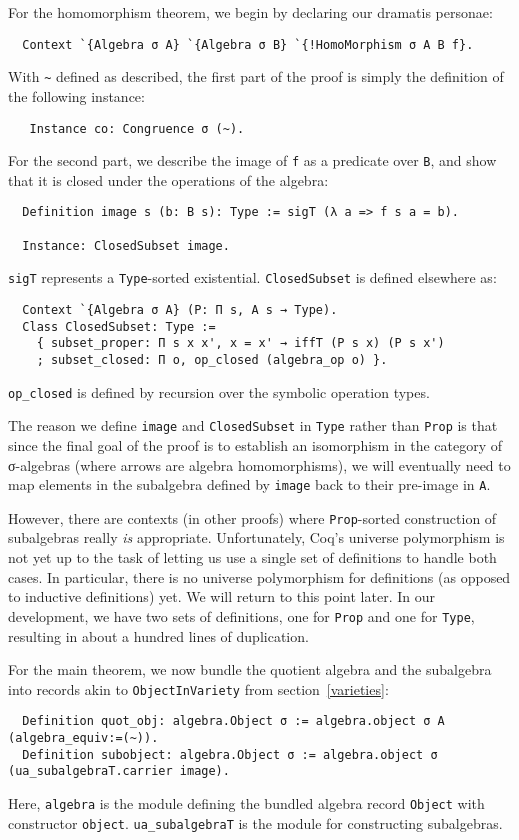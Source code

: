 \documentclass[a4paper,10pt,runningheads]{llncs}
\begin{document}
For the homomorphism theorem, we begin by declaring our dramatis personae:
\begin{lstlisting}
  Context `{Algebra σ A} `{Algebra σ B} `{!HomoMorphism σ A B f}.
\end{lstlisting}
With \lstinline|~| defined as described, the first part of the proof is simply the definition of the following instance:
\begin{lstlisting}
   Instance co: Congruence σ (~).
\end{lstlisting}

For the second part, we describe the image of \lstinline|f| as a predicate over \lstinline|B|, and show that it is closed under the operations of the algebra: 
\begin{lstlisting}
  Definition image s (b: B s): Type := sigT (λ a => f s a = b).

  Instance: ClosedSubset image.
\end{lstlisting}
\lstinline|sigT| represents a \lstinline|Type|-sorted existential. \lstinline|ClosedSubset| is defined elsewhere as:
\begin{lstlisting}
  Context `{Algebra σ A} (P: Π s, A s → Type).
  Class ClosedSubset: Type :=
    { subset_proper: Π s x x', x = x' → iffT (P s x) (P s x')
    ; subset_closed: Π o, op_closed (algebra_op o) }.
\end{lstlisting}
\lstinline|op_closed| is defined by recursion over the symbolic operation types.

The reason we define \lstinline|image| and \lstinline|ClosedSubset| in \lstinline|Type| rather than \lstinline|Prop| is that since the final goal of the proof is to establish an isomorphism in the category of σ-algebras (where arrows are algebra homomorphisms), we will eventually need to map elements in the subalgebra defined by \lstinline|image| back to their pre-image in \lstinline|A|.

However, there are contexts (in other proofs) where \lstinline|Prop|-sorted construction of subalgebras really \emph{is} appropriate. Unfortunately, Coq's universe polymorphism is not yet up to the task of letting us use a single set of definitions to handle both cases. In particular, there is no universe polymorphism for definitions (as opposed to inductive definitions) yet. We will return to this point later. In our development, we have two sets of definitions, one for \lstinline|Prop| and one for \lstinline|Type|, resulting in about a hundred lines of duplication.

For the main theorem, we now bundle the quotient algebra and the subalgebra into records akin to \lstinline|ObjectInVariety| from section~\ref{varieties}:
\begin{lstlisting}
  Definition quot_obj: algebra.Object σ := algebra.object σ A (algebra_equiv:=(~)).
  Definition subobject: algebra.Object σ := algebra.object σ (ua_subalgebraT.carrier image).
\end{lstlisting}
Here, \lstinline|algebra| is the module defining the bundled algebra record \lstinline|Object| with constructor \lstinline|object|. \lstinline|ua_subalgebraT| is the module for constructing subalgebras.
\end{document}
